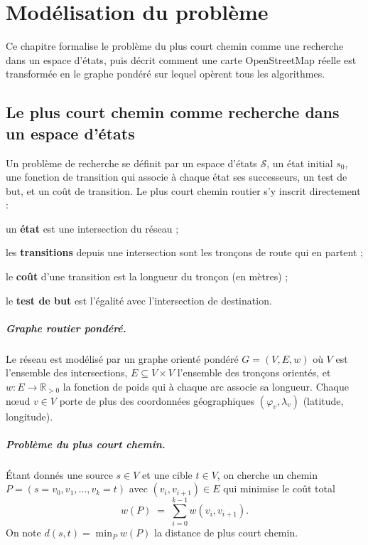 \chapter{Modélisation du problème}
\label{ch:modelisation}

Ce chapitre formalise le problème du plus court chemin comme une recherche dans
un espace d'états, puis décrit comment une carte OpenStreetMap réelle est
transformée en le graphe pondéré sur lequel opèrent tous les algorithmes.

\section{Le plus court chemin comme recherche dans un espace d'états}
\label{sec:espace-etats}

Un problème de recherche se définit par un espace d'états
$\mathcal{S}$, un état initial $s_0$, une fonction de transition qui associe à
chaque état ses successeurs, un test de but, et un coût de transition. Le plus
court chemin routier s'y inscrit directement :

\begin{bulletlist}
  \item un \textbf{état} est une intersection du réseau ;
  \item les \textbf{transitions} depuis une intersection sont les tronçons de
        route qui en partent ;
  \item le \textbf{coût} d'une transition est la longueur du tronçon (en mètres) ;
  \item le \textbf{test de but} est l'égalité avec l'intersection de destination.
\end{bulletlist}

\paragraph{Graphe routier pondéré.}
Le réseau est modélisé par un graphe orienté pondéré $G = (V, E, w)$ où $V$ est
l'ensemble des intersections, $E \subseteq V \times V$ l'ensemble des tronçons
orientés, et $w : E \to \mathbb{R}_{>0}$ la fonction de poids qui à chaque arc
associe sa longueur. Chaque nœud $v \in V$ porte de plus des coordonnées
géographiques $(\varphi_v, \lambda_v)$ (latitude, longitude).

\medskip

\paragraph{Problème du plus court chemin.}
Étant donnés une source $s \in V$ et une cible $t \in V$, on cherche un chemin
$P = (s = v_0, v_1, \dots, v_k = t)$ avec $(v_{i}, v_{i+1}) \in E$ qui minimise le
coût total
\[
  w(P) \;=\; \sum_{i=0}^{k-1} w(v_i, v_{i+1}).
\]
On note $d(s, t) = \min_P w(P)$ la distance de plus court chemin.

